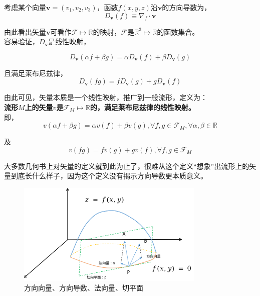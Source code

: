 	考虑某个向量$\mathbf{v} = (v_1,v_2,v_3)$，函数$f(x,y,z)$沿$\mathbf{v}$的方向导数为，
	$$
		D_\mathbf{v}(f) \equiv\nabla_f \cdot \mathbf{v}
	$$

	由此看出矢量$\mathbf{v}$可看作$\mathscr{F} \mapsto \mathbb{R} $的映射，$\mathscr{F}$是$\mathbb{R}^3\mapsto \mathbb{R}$的函数集合。\\

	容易验证，$D_\mathbf{v}$是线性映射，

	$$
		D_\mathbf{v}(\alpha f+ \beta g) = \alpha D_\mathbf{v}(f) + \beta D_\mathbf{v}(g)
	$$

	且满足莱布尼兹律，
	$$
		D_\mathbf{v}(fg) = fD_\mathbf{v}(g) + gD_\mathbf{v}(f)
	$$

	由此可见，矢量本质是一个线性映射，推广到一般流形，定义为：\\

	\textbf{流形$M$上的矢量$v$是$\mathscr{F}_M \mapsto \mathbb{R} $的，满足莱布尼兹律的线性映射。}\\

	即，
	\begin{equation} \label{v_linear}
		v(\alpha f+ \beta g) = \alpha v(f) + \beta v(g),\forall f,g \in \mathscr{F}_M,\forall \alpha,\beta \in \mathbb{R}
	\end{equation}

	及
	\begin{equation} \label{v_leb}
		v(fg) = fv(g) + gv(f),\forall f,g \in \mathscr{F}_M
	\end{equation}

	大多数几何书上对矢量的定义就到此为止了，很难从这个定义“想象”出流形上的矢量到底长什么样子，因为这个定义没有揭示方向导数更本质意义。\\

	\begin{figure}[H]
		\begin{center}
			\includegraphics[width=0.8\textwidth]{images/direct_vector.png}
		\end{center}
		\caption{方向向量、方向导数、法向量、切平面}
	\end{figure}	

